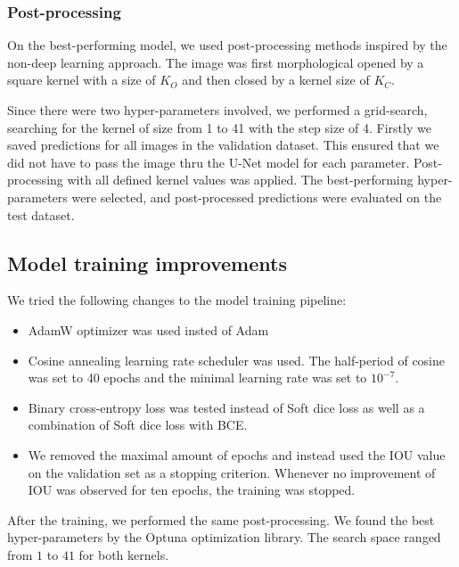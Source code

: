 \subsubsection{Post-processing}
\label{sec:segmentation_post_processing}
On the best-performing model, we used post-processing methods inspired by the non-deep learning approach. The image was first morphological opened by a square kernel with a size of $K_O$ and then closed by a kernel size of $K_C$.

Since there were two hyper-parameters involved, we performed a grid-search, searching for the kernel of size from 1 to 41 with the step size of 4. Firstly we saved predictions for all images in the validation dataset. This ensured that we did not have to pass the image thru the U-Net model for each parameter. Post-processing with all defined kernel values was applied. The best-performing hyper-parameters were selected, and post-processed predictions were evaluated on the test dataset.

\subsection{Model training improvements}
We tried the following changes to the model training pipeline:
\begin{itemize}
    \item AdamW optimizer was used insted of Adam
    \item Cosine annealing learning rate scheduler was used. The half-period of cosine was set to 40 epochs and the minimal learning rate was set to $10^{-7}$.
    \item Binary cross-entropy loss was tested instead of Soft dice loss as well as a combination of Soft dice loss with BCE.
    \item We removed the maximal amount of epochs and instead used the IOU value on the validation set as a stopping criterion. Whenever no improvement of IOU was observed for ten epochs, the training was stopped.
\end{itemize}

After the training, we performed the same post-processing. We found the best hyper-parameters by the Optuna optimization library. The search space ranged from $1$ to $41$ for both kernels.


